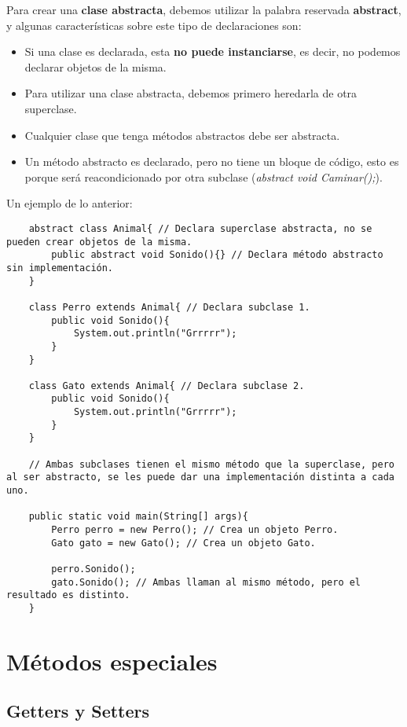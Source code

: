 Para crear una \textbf{clase abstracta}, debemos utilizar la palabra reservada \textbf{abstract}, y algunas características sobre este tipo de declaraciones son:
\begin{itemize}
    \item Si una clase es declarada, esta \textbf{no puede instanciarse}, es decir, no podemos declarar objetos de la misma.
    \item Para utilizar una clase abstracta, debemos primero heredarla de otra superclase.
    \item Cualquier clase que tenga métodos abstractos debe ser abstracta.
    \item Un método abstracto es declarado, pero no tiene un bloque de código, esto es porque será reacondicionado por otra subclase (\textit{abstract void Caminar();}).
\end{itemize}

Un ejemplo de lo anterior:
\begin{lstlisting}
    abstract class Animal{ // Declara superclase abstracta, no se pueden crear objetos de la misma.
        public abstract void Sonido(){} // Declara método abstracto sin implementación.
    }
    
    class Perro extends Animal{ // Declara subclase 1.
        public void Sonido(){
            System.out.println("Grrrrr");
        }
    }
    
    class Gato extends Animal{ // Declara subclase 2.
        public void Sonido(){
            System.out.println("Grrrrr");
        }
    }
    
    // Ambas subclases tienen el mismo método que la superclase, pero al ser abstracto, se les puede dar una implementación distinta a cada uno.
    
    public static void main(String[] args){
        Perro perro = new Perro(); // Crea un objeto Perro.
        Gato gato = new Gato(); // Crea un objeto Gato.
        
        perro.Sonido();
        gato.Sonido(); // Ambas llaman al mismo método, pero el resultado es distinto.
    }
\end{lstlisting}



\section{Métodos especiales}


\subsection{Getters y Setters}

